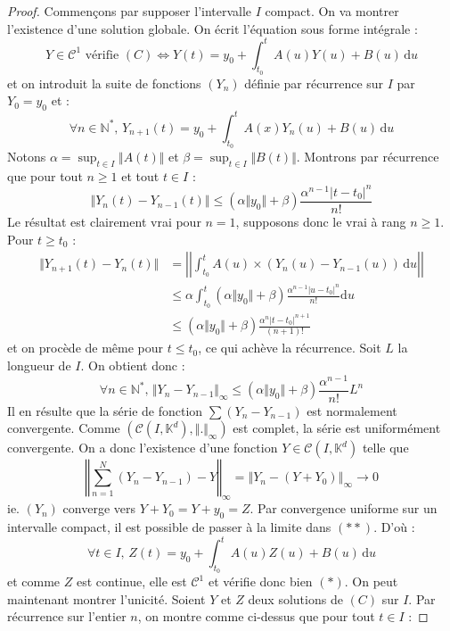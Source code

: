   \begin{proof}
    Commençons par supposer l'intervalle $I$ compact. On va montrer l'existence d'une solution globale. On écrit l'équation sous forme intégrale :
    \[ Y \in \mathcal{C}^1 \text{ vérifie } (C) \iff Y(t) = y_0 + \int_{t_0}^t A(u) Y(u) + B(u) \, \mathrm{d}u \tag{$*$} \]
    et on introduit la suite de fonctions $(Y_n)$ définie par récurrence sur $I$ par $Y_0 = y_0$ et :
    \[ \forall n \in \mathbb{N}^*, \, Y_{n+1}(t) = y_0 + \int_{t_0}^t A(x) Y_n(u) + B(u) \, \mathrm{d}u \tag{$**$} \]
    Notons $\alpha = \sup_{t \in I} \Vert A(t) \Vert$ et $\beta = \sup_{t \in I} \Vert B(t) \Vert$. Montrons par récurrence que pour tout $n \geq 1$ et tout $t \in I$ :
    \[ \Vert Y_n(t) - Y_{n-1}(t) \Vert \leq (\alpha \Vert y_0 \Vert + \beta) \frac{\alpha^{n-1} |t-t_0|^n}{n!} \]
    Le résultat est clairement vrai pour $n = 1$, supposons donc le vrai à rang $n \geq 1$. Pour $t \geq t_0$ :
    \begin{align*}
      \Vert Y_{n+1}(t) - Y_n(t) \Vert &= \left| \left| \int_{t_0}^t A(u) \times (Y_n(u) - Y_{n-1}(u)) \, \mathrm{d}u \right| \right| \\
      &\leq \alpha \int_{t_0}^t (\alpha \Vert y_0 \Vert + \beta) \frac{\alpha^{n-1} |u-t_0|^n}{n!} \mathrm{d}u \\
      &\leq (\alpha \Vert y_0 \Vert + \beta) \frac{\alpha^n |t-t_0|^{n+1}}{(n+1)!}
    \end{align*}
    et on procède de même pour $t \leq t_0$, ce qui achève la récurrence.
    \newpar
    Soit $L$ la longueur de $I$. On obtient donc :
    \[ \forall n \in \mathbb{N}^*, \, \Vert Y_n - Y_{n-1} \Vert_{\infty} \leq (\alpha \Vert y_0 \Vert + \beta) \frac{\alpha^{n-1}}{n!} L^n \]
    Il en résulte que la série de fonction $\sum (Y_n - Y_{n-1})$ est normalement convergente. Comme $(\mathcal{C} (I, \mathbb{K}^d), \Vert . \Vert_{\infty})$ est complet, la série est uniformément convergente. On a donc l'existence d'une fonction $Y \in \mathcal{C} (I, \mathbb{K}^d)$ telle que
    \[ \left \Vert \sum_{n=1}^N (Y_n - Y_{n-1}) - Y \right \Vert_\infty = \left \Vert Y_n - (Y + Y_0) \right \Vert_\infty \longrightarrow 0 \]
    ie. $(Y_n)$ converge vers $Y + Y_0 = Y + y_0 = Z$. Par convergence uniforme sur un intervalle compact, il est possible de passer à la limite dans $(**)$. D'où :
    \[ \forall t \in I, \, Z(t) = y_0 + \int_{t_0}^t A(u) Z(u) + B(u) \, \mathrm{d}u \]
    et comme $Z$ est continue, elle est $\mathcal{C}^1$ et vérifie donc bien $(*)$.
    \newpar
    On peut maintenant montrer l'unicité. Soient $Y$ et $Z$ deux solutions de $(C)$ sur $I$. Par récurrence sur l'entier $n$, on montre comme ci-dessus que pour tout $t \in I$ :

\end{proof}
